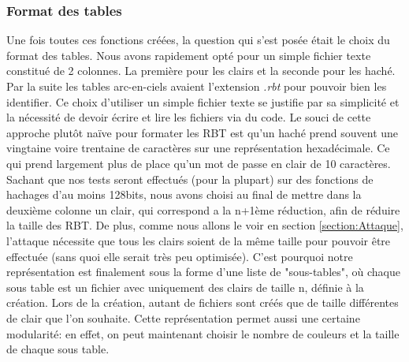 \documentclass[french,12pt]{article}
\begin{document}
         \subsubsection{Format des tables} \label{section:Format}
         Une fois toutes ces fonctions créées, la question qui s'est posée était le choix du format des tables. Nous avons rapidement opté pour un simple fichier texte constitué de 2 colonnes. La première pour les clairs et la seconde pour les haché. Par la suite les tables arc-en-ciels avaient l'extension \textit{.rbt} pour pouvoir bien les identifier. Ce choix d'utiliser un simple fichier texte se justifie par sa simplicité et la nécessité de devoir écrire et lire les fichiers via du code.
         \newline
         \indent Le souci de cette approche plutôt naïve pour formater les RBT est qu'un haché prend souvent une vingtaine voire trentaine de caractères sur une représentation hexadécimale. Ce qui prend largement plus de place qu'un mot de passe en clair de 10 caractères.
         Sachant que nos tests seront effectués (pour la plupart) sur des fonctions de hachages d'au moins 128bits, nous avons choisi au final de mettre dans la deuxième colonne un clair, qui correspond a la n+1ème réduction, afin de réduire la taille des RBT.
         \newline
         \indent De plus, comme nous allons le voir en section \ref{section:Attaque}, l'attaque nécessite que tous les clairs soient de la même taille pour pouvoir être effectuée (sans quoi elle serait très peu optimisée). C'est pourquoi notre représentation est finalement sous la forme d'une liste de "sous-tables", où chaque sous table est un fichier avec uniquement des clairs de taille n, définie à la création. Lors de la création, autant de fichiers sont créés que de taille différentes de clair que l'on souhaite. Cette représentation permet aussi une certaine modularité: en effet, on peut maintenant choisir le nombre de couleurs et la taille de chaque sous table.
         
\end{document}
